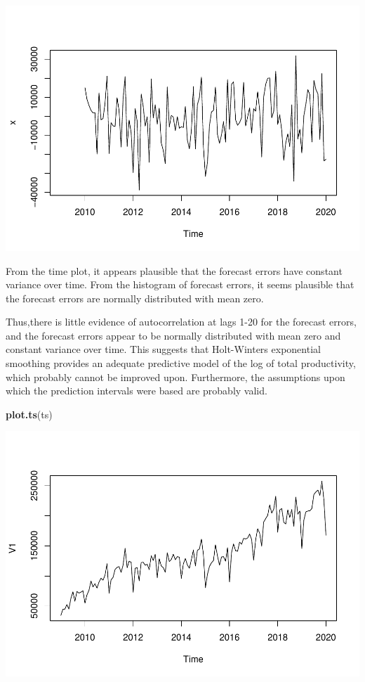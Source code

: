 \documentclass[
]{article}
\newenvironment{Shaded}{\begin{snugshade}}{\end{snugshade}}
\newcommand{\CommentTok}[1]{\textcolor[rgb]{0.56,0.35,0.01}{\textit{#1}}}
\newcommand{\KeywordTok}[1]{\textcolor[rgb]{0.13,0.29,0.53}{\textbf{#1}}}
\newcommand{\NormalTok}[1]{#1}
\begin{document}
\includegraphics{tsf_export_files/figure-latex/unnamed-chunk-18-1.pdf}

\begin{Shaded}
\end{Shaded}

From the time plot, it appears plausible that the forecast errors have
constant variance over time. From the histogram of forecast errors, it
seems plausible that the forecast errors are normally distributed with
mean zero.

Thus,there is little evidence of autocorrelation at lags 1-20 for the
forecast errors, and the forecast errors appear to be normally
distributed with mean zero and constant variance over time. This
suggests that Holt-Winters exponential smoothing provides an adequate
predictive model of the log of total productivity, which probably cannot
be improved upon. Furthermore, the assumptions upon which the prediction
intervals were based are probably valid.

\begin{Shaded}
\begin{Highlighting}[]
\KeywordTok{plot.ts}\NormalTok{(ts)}
\end{Highlighting}
\end{Shaded}

\includegraphics{tsf_export_files/figure-latex/unnamed-chunk-20-1.pdf}
\end{document}
